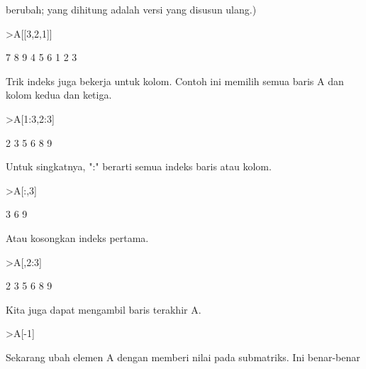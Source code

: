 \documentclass[a4paper,10pt]{article}
\begin{document}
\begin{eulernotebook}
\begin{eulercomment}
\begin{eulercomment}
\begin{eulercomment}
\begin{eulercomment}
\begin{eulercomment}
\begin{eulercomment}
\begin{eulercomment}
\begin{eulercomment}
\begin{eulercomment}
\begin{eulercomment}
\begin{eulercomment}
\begin{eulercomment}
\begin{eulercomment}
\begin{eulercomment}
\begin{eulercomment}
\begin{eulercomment}
\begin{eulercomment}
\begin{eulercomment}
\begin{eulercomment}
berubah; yang dihitung adalah versi yang disusun ulang.)
\end{eulercomment}
\begin{eulerprompt}
>A[[3,2,1]]
\end{eulerprompt}
\begin{euleroutput}
              7             8             9 
              4             5             6 
              1             2             3 
\end{euleroutput}
\begin{eulercomment}
Trik indeks juga bekerja untuk kolom. Contoh ini memilih semua baris A dan
kolom kedua dan ketiga.
\end{eulercomment}
\begin{eulerprompt}
>A[1:3,2:3]
\end{eulerprompt}
\begin{euleroutput}
              2             3 
              5             6 
              8             9 
\end{euleroutput}
\begin{eulercomment}
Untuk singkatnya, ":" berarti semua indeks baris atau kolom.
\end{eulercomment}
\begin{eulerprompt}
>A[:,3]
\end{eulerprompt}
\begin{euleroutput}
              3 
              6 
              9 
\end{euleroutput}
\begin{eulercomment}
Atau kosongkan indeks pertama.
\end{eulercomment}
\begin{eulerprompt}
>A[,2:3]
\end{eulerprompt}
\begin{euleroutput}
              2             3 
              5             6 
              8             9 
\end{euleroutput}
\begin{eulercomment}
Kita juga dapat mengambil baris terakhir A.
\end{eulercomment}
\begin{eulerprompt}
>A[-1]
\end{eulerprompt}
\begin{euleroutput}
  [7,  8,  9]
\end{euleroutput}
\begin{eulercomment}
Sekarang ubah elemen A dengan memberi nilai pada submatriks. Ini benar-benar

\end{eulercomment}
\end{eulercomment}
\end{eulercomment}
\end{eulercomment}
\end{eulercomment}
\end{eulercomment}
\end{eulercomment}
\end{eulercomment}
\end{eulercomment}
\end{eulercomment}
\end{eulercomment}
\end{eulercomment}
\end{eulercomment}
\end{eulercomment}
\end{eulercomment}
\end{eulercomment}
\end{eulercomment}
\end{eulercomment}
\end{eulercomment}
\end{eulernotebook}
\end{document}
